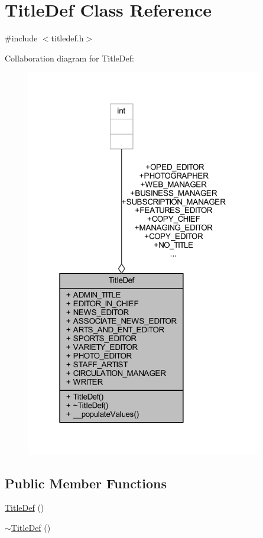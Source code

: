 \hypertarget{class_title_def}{}\section{Title\+Def Class Reference}
\label{class_title_def}


{\ttfamily \#include $<$titledef.\+h$>$}



Collaboration diagram for Title\+Def\+:
\nopagebreak
\begin{figure}[H]
\begin{center}
\leavevmode
\includegraphics[width=292pt]{class_title_def__coll__graph}
\end{center}
\end{figure}
\subsection*{Public Member Functions}
\begin{DoxyCompactItemize}
\item 
\hyperlink{class_title_def_a7d0825d98f0c072690abb44c63becee4}{Title\+Def} ()
\item 
\hyperlink{class_title_def_a2c6fe65f61c86ec1ea2532716cce1e86}{$\sim$\+Title\+Def} ()
\end{DoxyCompactItemize}

